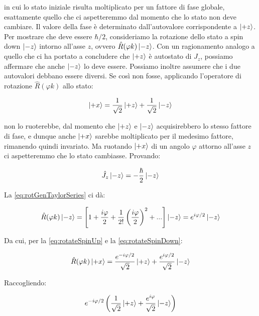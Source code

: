 in cui lo stato iniziale risulta moltiplicato per un fattore di fase globale, esattamente quello che ci aspetteremmo dal momento che lo stato non deve cambiare. Il valore della fase \`e determinato dall'autovalore corrispondente a $\ket{+z}$. Per mostrare che deve essere $\hbar / 2$, consideriamo la rotazione dello stato a spin down $\ket{-z}$ intorno all'asse $z$, ovvero $\hat{R}(\varphi k) \ket{-z}$. Con un ragionamento analogo a quello che ci ha portato a concludere che $\ket{+z}$ \`e autostato di $\hat{J}_z$, possiamo affermare che anche $\ket{-z}$ lo deve essere. Possiamo inoltre assumere che i due autovalori debbano essere diversi. Se cos\`i non fosse, applicando l'operatore di rotazione $\hat{R} (\varphi k )$ allo stato:

	\begin{equation}
		\ket{+x} = \frac{1}{\sqrt{2}} \ket{+z} + \frac{1}{\sqrt{2}} \ket{-z}
	\end{equation}

non lo ruoterebbe, dal momento che $\ket{+z}$ e $\ket{-z}$ acquisirebbero lo stesso fattore di fase, e dunque anche $\ket{+x}$ sarebbe moltiplicato per il medesimo fattore, rimanendo quindi invariato. Ma ruotando $\ket{+x}$ di un angolo $\varphi$ attorno all'asse $z$ ci aspetteremmo che lo stato cambiasse. Provando:

	\begin{equation}
		\hat{J}_z \ket{-z} = - \frac{\hbar}{2} \ket{-z}	
	\end{equation}

La \eqref{eq:rotGenTaylorSeries} ci d\`a:

	\begin{equation} \label{eq:rotateSpinDown}
		\hat{R}(\varphi k) \ket{-z} = \left [ 1 + \frac{i \varphi}{2} + \frac{1}{2!} \left( \frac{i \varphi}{2} \right )^2 + ... \right ] \ket{-z} = e^{i \varphi / 2} \ket {-z}
	\end{equation}

Da cui, per la \eqref{eq:rotateSpinUp} e la \eqref{eq:rotateSpinDown}:

	\begin{equation}
		\hat{R}(\varphi k) \ket{+x} = \frac{e^{-i \varphi / 2}}{\sqrt{2}} \ket{+z} + \frac{e^{i \varphi / 2}}{\sqrt{2}} \ket{-z}
	\end{equation}

Raccogliendo:

	\begin{equation}
		e^{-i \varphi / 2} \left ( \frac{1}{\sqrt{2}} \ket{+z} + \frac{e^{i \varphi}}{\sqrt{2}} \ket{-z} \right )
	\end{equation}

